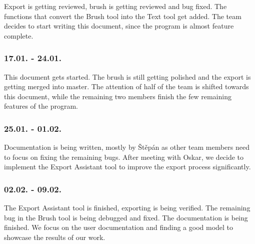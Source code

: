 Export is getting reviewed, brush is getting reviewed and bug fixed. The functions that convert the Brush tool into the Text tool get added. The team decides to start writing this document, since the program is almost feature complete.

\subsubsection{17.01. - 24.01.}

This document gets started. The brush is still getting polished and the export is getting merged into master. The attention of half of the team is shifted towards this document, while the remaining two members finish the few remaining features of the program.

\subsubsection{25.01. - 01.02.}

Documentation is being written, mostly by Štěpán as other team members need to focus on fixing the remaining bugs. After meeting with Oskar, we decide to implement the Export Assistant tool to improve the export process significantly.

\subsubsection{02.02. - 09.02.}

The Export Assistant tool is finished, exporting is being verified. The remaining bug in the Brush tool is being debugged and fixed. The documentation is being finished. We focus on the user documentation and finding a good model to showcase the results of our work.